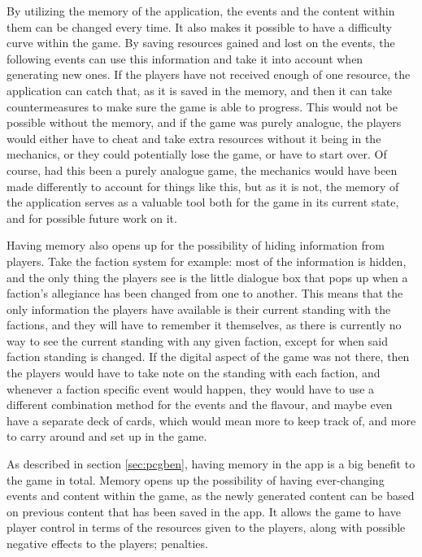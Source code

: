 By utilizing the memory of the application, the events and the content within them can be changed every time. 
It also makes it possible to have a difficulty curve within the game. By saving resources gained and lost on the events, 
the following events can use this information and take it into account when generating new ones. If the players have 
not received enough of one resource, the application can catch that, as it is saved in the memory, and then it can 
take countermeasures to make sure the game is able to progress. This would not be possible without the memory, and 
if the game was purely analogue, the players would either have to cheat and take extra resources without it being in 
the mechanics, or they could potentially lose the game, or have to start over. Of course, had this been a purely analogue 
game, the mechanics would have been made differently to account for things like this, but as it is not, the memory of 
the application serves as a valuable tool both for the game in its current state, and for possible future work on it.

Having memory also opens up for the possibility of hiding information from players. Take the faction system for example:
 most of the information is hidden, and the only thing the players see is the little dialogue box that pops up when a 
 faction's allegiance has been changed from one to another. This means that the only information the players have available 
 is their current standing with the factions, and they will have to remember it themselves, as there is currently no 
 way to see the current standing with any given faction, except for when said faction standing is changed. 
 If the digital aspect of the game was not there, then the players would have to take note on the standing with each faction, 
 and whenever a faction specific event would happen, they would have to use a different combination method for the events 
 and the flavour, and maybe even have a separate deck of cards, which would mean more to keep track of, and more to carry 
 around and set up in the game.

As described in section \ref{sec:pcgben}, having memory in the app is a big benefit to the game in total.
Memory opens up the possibility of having ever-changing events and content within the game, as the newly generated content 
can be based on previous content that has been saved in the app.
It allows the game to have player control in terms of the resources given to the players, along with possible negative 
effects to the players; penalties. 

